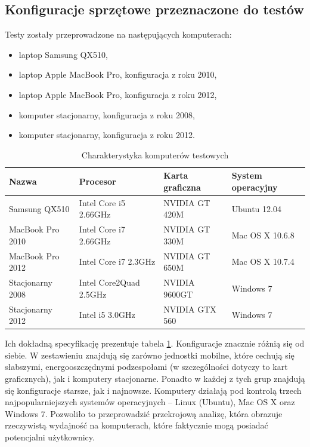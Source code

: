 \subsection{Konfiguracje sprzętowe przeznaczone do testów}
\label{sec:konfiguracjaKompow}

Testy zostały przeprowadzone na następujących komputerach:

\begin{itemize}

\item laptop Samsung QX510,
\item laptop Apple MacBook Pro, konfiguracja z roku 2010,
\item laptop Apple MacBook Pro, konfiguracja z roku 2012,
\item komputer stacjonarny, konfiguracja z roku 2008,
\item komputer stacjonarny, konfiguracja z roku 2012.

\end{itemize}

\begin{table}[!h]
\caption{Charakterystyka komputerów testowych}
\centering
\begin{tabular}{|l|l|l|l|}
\hline
Nazwa & Procesor & Karta graficzna & System operacyjny \\ \hline
Samsung QX510 & Intel Core i5 2.66GHz & NVIDIA GT 420M & Ubuntu 12.04 \\ \hline
MacBook Pro 2010 & Intel Core i7 2.66GHz & NVIDIA GT 330M & Mac OS X 10.6.8 \\ \hline
MacBook Pro 2012 & Intel Core i7 2.3GHz & NVIDIA GT 650M & Mac OS X 10.7.4 \\ \hline
Stacjonarny 2008 & Intel Core2Quad 2.5GHz & NVIDIA 9600GT & Windows 7 \\ \hline
Stacjonarny 2012 & Intel i5 3.0GHz & NVIDIA GTX 560 & Windows 7 \\ \hline
\end{tabular}
\label{tab:komputery}
\end{table}

Ich dokładną specyfikację prezentuje tabela \ref{tab:komputery}. Konfiguracje
znacznie różnią się od siebie. W zestawieniu znajdują się zarówno jednostki
mobilne, które cechują się słabszymi, energooszczędnymi podzespołami (w
szczególności dotyczy to kart graficznych), jak i komputery stacjonarne.
Ponadto w każdej z tych grup znajdują się konfiguracje starsze, jak i
najnowsze. Komputery działają pod kontrolą trzech najpopularniejszych systemów
operacyjnych -- Linux (Ubuntu), Mac OS X oraz Windows 7. Pozwoliło to
przeprowadzić przekrojową analizę, która obrazuje rzeczywistą wydajność na
komputerach, które faktycznie mogą posiadać potencjalni użytkownicy.

